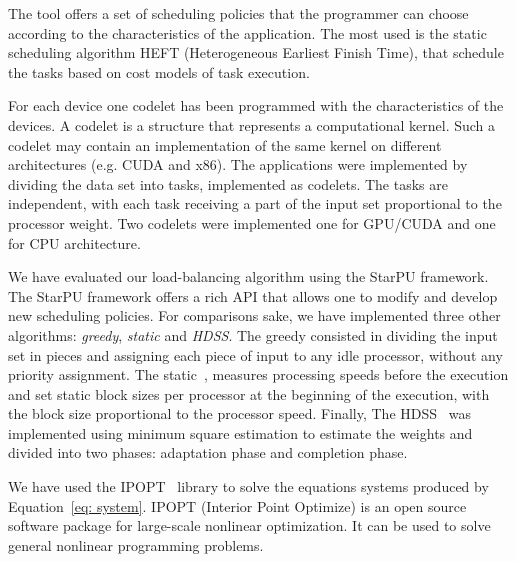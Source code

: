 \documentclass[journal]{IEEEtran}
\begin{document}
The tool offers a set of scheduling policies that the programmer can
choose according to the characteristics of the application. The most used is the static scheduling algorithm HEFT (Heterogeneous Earliest Finish Time), that
schedule the tasks based on cost models of task execution.

For each device one codelet has been programmed with the characteristics of the
devices. A codelet is a structure that represents a computational kernel. Such a
codelet may contain an implementation of the same kernel on different
architectures (e.g. CUDA and x86).  The applications were implemented by
dividing the data set into tasks, implemented as codelets. The tasks are
independent, with each task receiving a part of the input set proportional to
the processor weight. Two codelets were implemented one for GPU/CUDA and one for
CPU architecture.

We have evaluated our load-balancing algorithm using the StarPU framework.
The StarPU framework offers a rich API that allows one to modify and develop new scheduling policies.
%
%
%
For comparisons sake, we have implemented three other algorithms:
\emph{greedy}, \emph{static} and
\emph{HDSS}. The greedy consisted in dividing the input set in pieces and assigning
each piece of input to any idle processor, without any priority assignment. The
static~\cite{raphael}, measures processing speeds before the execution and set
static block sizes per processor at the beginning of the execution, with the
block size proportional to the processor speed. Finally, The HDSS~\cite{HDSS}
was implemented using minimum square estimation to estimate the weights and
divided into two phases: adaptation phase and completion phase.

We have used the IPOPT~\cite{point} library to solve the equations systems produced by Equation~\ref{eq: system}. IPOPT (Interior Point Optimize) is an open source software package for large-scale nonlinear optimization. It can be used to solve general nonlinear programming problems.
\end{document}
